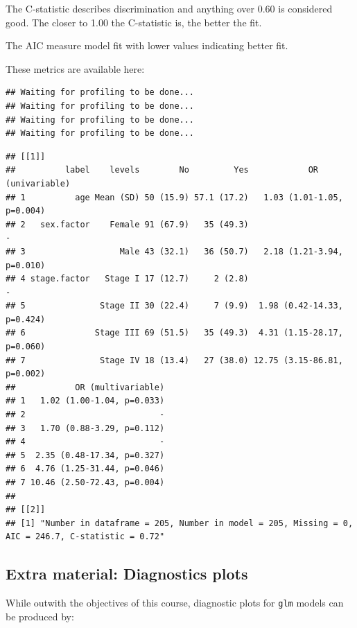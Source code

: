 \documentclass[]{book}
\makeatletter
\newenvironment{Shaded}{\begin{snugshade}}{\end{snugshade}}
\newcommand{\KeywordTok}[1]{\textcolor[rgb]{0.13,0.29,0.53}{\textbf{#1}}}
\newcommand{\DataTypeTok}[1]{\textcolor[rgb]{0.13,0.29,0.53}{#1}}
\newcommand{\StringTok}[1]{\textcolor[rgb]{0.31,0.60,0.02}{#1}}
\newcommand{\OtherTok}[1]{\textcolor[rgb]{0.56,0.35,0.01}{#1}}
\newcommand{\OperatorTok}[1]{\textcolor[rgb]{0.81,0.36,0.00}{\textbf{#1}}}
\newcommand{\NormalTok}[1]{#1}
\newenvironment{kframe}{%
\medskip{}
\setlength{\fboxsep}{.8em}
 \def\at@end@of@kframe{}%
 \ifinner\ifhmode%
  \def\at@end@of@kframe{\end{minipage}}%
  \begin{minipage}{\columnwidth}%
 \fi\fi%
 \def\FrameCommand##1{\hskip\@totalleftmargin \hskip-\fboxsep
 \colorbox{shadecolor}{##1}\hskip-\fboxsep
     \hskip-\linewidth \hskip-\@totalleftmargin \hskip\columnwidth}%
 \MakeFramed {\advance\hsize-\width
   \@totalleftmargin\z@ \linewidth\hsize
   \@setminipage}}%
 {\par\unskip\endMakeFramed%
 \at@end@of@kframe}
\renewenvironment{Shaded}{\begin{kframe}}{\end{kframe}}
\makeatother
\begin{document}
The C-statistic describes discrimination and anything over 0.60 is
considered good. The closer to 1.00 the C-statistic is, the better the
fit.

The AIC measure model fit with lower values indicating better fit.

These metrics are available here:

\begin{Shaded}
\end{Shaded}

\begin{verbatim}
## Waiting for profiling to be done...
## Waiting for profiling to be done...
## Waiting for profiling to be done...
## Waiting for profiling to be done...
\end{verbatim}

\begin{verbatim}
## [[1]]
##          label    levels        No         Yes            OR (univariable)
## 1          age Mean (SD) 50 (15.9) 57.1 (17.2)   1.03 (1.01-1.05, p=0.004)
## 2   sex.factor    Female 91 (67.9)   35 (49.3)                           -
## 3                   Male 43 (32.1)   36 (50.7)   2.18 (1.21-3.94, p=0.010)
## 4 stage.factor   Stage I 17 (12.7)     2 (2.8)                           -
## 5               Stage II 30 (22.4)     7 (9.9)  1.98 (0.42-14.33, p=0.424)
## 6              Stage III 69 (51.5)   35 (49.3)  4.31 (1.15-28.17, p=0.060)
## 7               Stage IV 18 (13.4)   27 (38.0) 12.75 (3.15-86.81, p=0.002)
##            OR (multivariable)
## 1   1.02 (1.00-1.04, p=0.033)
## 2                           -
## 3   1.70 (0.88-3.29, p=0.112)
## 4                           -
## 5  2.35 (0.48-17.34, p=0.327)
## 6  4.76 (1.25-31.44, p=0.046)
## 7 10.46 (2.50-72.43, p=0.004)
## 
## [[2]]
## [1] "Number in dataframe = 205, Number in model = 205, Missing = 0, AIC = 246.7, C-statistic = 0.72"
\end{verbatim}

\subsection{Extra material: Diagnostics
plots}\label{extra-material-diagnostics-plots}

While outwith the objectives of this course, diagnostic plots for
\texttt{glm} models can be produced by:
\end{document}
